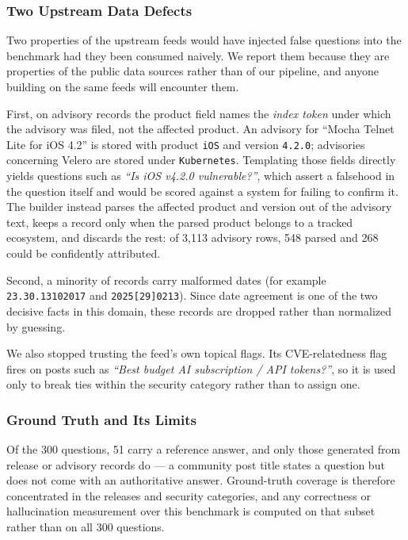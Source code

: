\subsubsection{Two Upstream Data Defects}

Two properties of the upstream feeds would have injected false questions into
the benchmark had they been consumed naively. We report them because they are
properties of the public data sources rather than of our pipeline, and anyone
building on the same feeds will encounter them.

First, on advisory records the product field names the \emph{index token} under
which the advisory was filed, not the affected product. An advisory for ``Mocha
Telnet Lite for iOS 4.2'' is stored with product \texttt{iOS} and version
\texttt{4.2.0}; advisories concerning Velero are stored under
\texttt{Kubernetes}. Templating those fields directly yields questions such as
\emph{``Is iOS v4.2.0 vulnerable?''}, which assert a falsehood in the question
itself and would be scored against a system for failing to confirm it. The
builder instead parses the affected product and version out of the advisory
text, keeps a record only when the parsed product belongs to a tracked
ecosystem, and discards the rest: of 3,113 advisory rows, 548 parsed and 268
could be confidently attributed.

Second, a minority of records carry malformed dates (for example
\texttt{23.30.13102017} and \texttt{2025[29]0213}). Since date agreement is one
of the two decisive facts in this domain, these records are dropped rather than
normalized by guessing.

We also stopped trusting the feed's own topical flags. Its CVE-relatedness flag
fires on posts such as \emph{``Best budget AI subscription / API tokens?''}, so
it is used only to break ties within the security category rather than to assign
one.

\subsubsection{Ground Truth and Its Limits}

Of the 300 questions, 51 carry a reference answer, and only those generated from
release or advisory records do --- a community post title states a question but
does not come with an authoritative answer. Ground-truth coverage is therefore
concentrated in the releases and security categories, and any correctness or
hallucination measurement over this benchmark is computed on that subset rather
than on all 300 questions.

